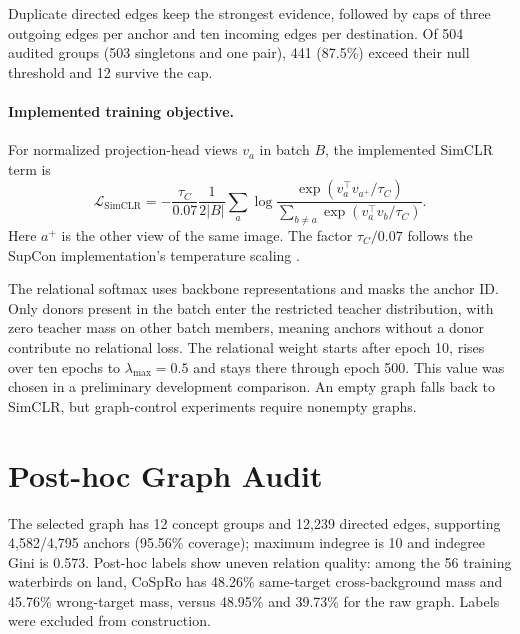 \documentclass{article}
\begin{document}
Duplicate directed edges keep the strongest evidence, followed by caps of three outgoing edges per anchor and ten incoming edges per destination. Of 504 audited groups (503 singletons and one pair), 441 (87.5\%) exceed their null threshold and 12 survive the cap.

\paragraph{Implemented training objective.}
For normalized projection-head views $v_a$ in batch $B$, the implemented SimCLR term is
\begin{equation}
\mathcal{L}_{\mathrm{SimCLR}} = -\frac{\tau_C}{0.07} \frac{1}{2|B|}
\sum_a \log
\frac{
    \exp(v_a^\top v_{a^+}/\tau_C)
}{
    \sum_{b\neq a}\exp(v_a^\top v_b/\tau_C)
}.
\end{equation}
Here $a^+$ is the other view of the same image. The factor $\tau_C/0.07$ follows the SupCon implementation's temperature scaling \citep{khosla2020supcon}.

The relational softmax uses backbone representations and masks the anchor ID. Only donors present in the batch enter the restricted teacher distribution, with zero teacher mass on other batch members, meaning anchors without a donor contribute no relational loss. The relational weight starts after epoch 10, rises over ten epochs to $\lambda_{\max}=0.5$ and stays there through epoch 500. This value was chosen in a preliminary development comparison. An empty graph falls back to SimCLR, but graph-control experiments require nonempty graphs.

\section{Post-hoc Graph Audit}\label{app:graphaudit}
The selected graph has 12 concept groups and 12,239 directed edges, supporting 4,582/4,795 anchors (95.56\% coverage); maximum indegree is 10 and indegree Gini is 0.573. Post-hoc labels show uneven relation quality: among the 56 training waterbirds on land, CoSpRo has 48.26\% same-target cross-background mass and 45.76\% wrong-target mass, versus 48.95\% and 39.73\% for the raw graph. Labels were excluded from construction.
\end{document}
